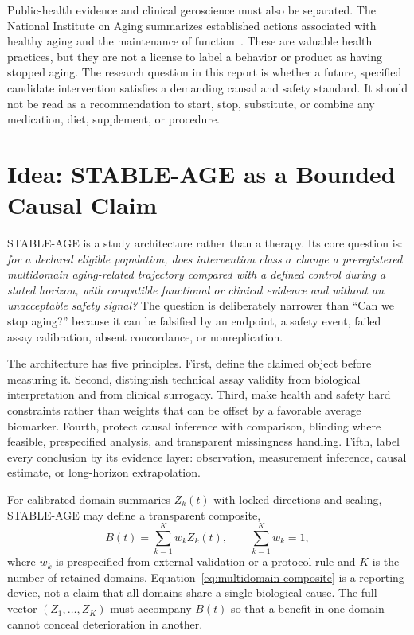 \documentclass[10pt,conference]{IEEEtran}
\begin{document}
Public-health evidence and clinical geroscience must also be separated. The National Institute on Aging summarizes established actions associated with healthy aging and the maintenance of function~\cite{nia2026}. These are valuable health practices, but they are not a license to label a behavior or product as having stopped aging. The research question in this report is whether a future, specified candidate intervention satisfies a demanding causal and safety standard. It should not be read as a recommendation to start, stop, substitute, or combine any medication, diet, supplement, or procedure.

\section{Idea: STABLE-AGE as a Bounded Causal Claim}
\label{sec:idea}

STABLE-AGE is a study architecture rather than a therapy. Its core question is: \emph{for a declared eligible population, does intervention class $a$ change a preregistered multidomain aging-related trajectory compared with a defined control during a stated horizon, with compatible functional or clinical evidence and without an unacceptable safety signal?} The question is deliberately narrower than ``Can we stop aging?'' because it can be falsified by an endpoint, a safety event, failed assay calibration, absent concordance, or nonreplication.

The architecture has five principles. First, define the claimed object before measuring it. Second, distinguish technical assay validity from biological interpretation and from clinical surrogacy. Third, make health and safety hard constraints rather than weights that can be offset by a favorable average biomarker. Fourth, protect causal inference with comparison, blinding where feasible, prespecified analysis, and transparent missingness handling. Fifth, label every conclusion by its evidence layer: observation, measurement inference, causal estimate, or long-horizon extrapolation.

For calibrated domain summaries $Z_k(t)$ with locked directions and scaling, STABLE-AGE may define a transparent composite,
\begin{equation}
B(t)=\sum_{k=1}^{K}w_k Z_k(t),\qquad \sum_{k=1}^{K}w_k=1,
\label{eq:multidomain-composite}
\end{equation}
where $w_k$ is prespecified from external validation or a protocol rule and $K$ is the number of retained domains. Equation~\eqref{eq:multidomain-composite} is a reporting device, not a claim that all domains share a single biological cause. The full vector $(Z_1,\ldots,Z_K)$ must accompany $B(t)$ so that a benefit in one domain cannot conceal deterioration in another.
\end{document}
